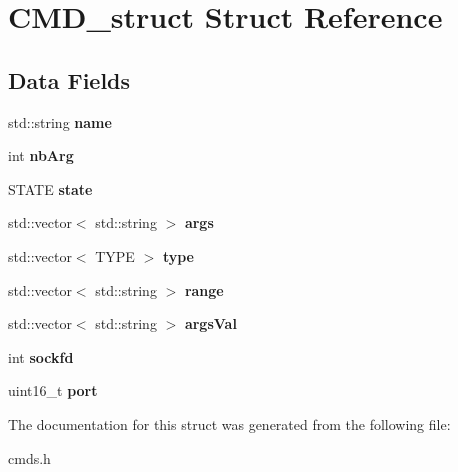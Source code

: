 \hypertarget{structCMD__struct}{}\section{C\+M\+D\+\_\+struct Struct Reference}
\label{structCMD__struct}
\subsection*{Data Fields}
\begin{DoxyCompactItemize}
\item 
std\+::string {\bfseries name}\hypertarget{structCMD__struct_a8ab4ba886023f138b889ac63783022b9}{}\label{structCMD__struct_a8ab4ba886023f138b889ac63783022b9}

\item 
int {\bfseries nb\+Arg}\hypertarget{structCMD__struct_a73ae6066506f07e69f67b612c7f00eb5}{}\label{structCMD__struct_a73ae6066506f07e69f67b612c7f00eb5}

\item 
S\+T\+A\+TE {\bfseries state}\hypertarget{structCMD__struct_aec6be48a8d44ad47e73f8816616533f2}{}\label{structCMD__struct_aec6be48a8d44ad47e73f8816616533f2}

\item 
std\+::vector$<$ std\+::string $>$ {\bfseries args}\hypertarget{structCMD__struct_aa657b551e83691e2d7008917c0bf1af3}{}\label{structCMD__struct_aa657b551e83691e2d7008917c0bf1af3}

\item 
std\+::vector$<$ T\+Y\+PE $>$ {\bfseries type}\hypertarget{structCMD__struct_a7bf3d25daacb9e9d6b7cb5614e636f18}{}\label{structCMD__struct_a7bf3d25daacb9e9d6b7cb5614e636f18}

\item 
std\+::vector$<$ std\+::string $>$ {\bfseries range}\hypertarget{structCMD__struct_abe517f7c7f50370ff96e8e08ea82429b}{}\label{structCMD__struct_abe517f7c7f50370ff96e8e08ea82429b}

\item 
std\+::vector$<$ std\+::string $>$ {\bfseries args\+Val}\hypertarget{structCMD__struct_a4ca9fbb91327cb413afe4c53c67af50a}{}\label{structCMD__struct_a4ca9fbb91327cb413afe4c53c67af50a}

\item 
int {\bfseries sockfd}\hypertarget{structCMD__struct_addbf79a701b139f45b5d4cd7bdd308be}{}\label{structCMD__struct_addbf79a701b139f45b5d4cd7bdd308be}

\item 
uint16\+\_\+t {\bfseries port}\hypertarget{structCMD__struct_ac44b8b125722dac462d23a9876806d3b}{}\label{structCMD__struct_ac44b8b125722dac462d23a9876806d3b}

\end{DoxyCompactItemize}


The documentation for this struct was generated from the following file\+:\begin{DoxyCompactItemize}
\item 
cmds.\+h\end{DoxyCompactItemize}
